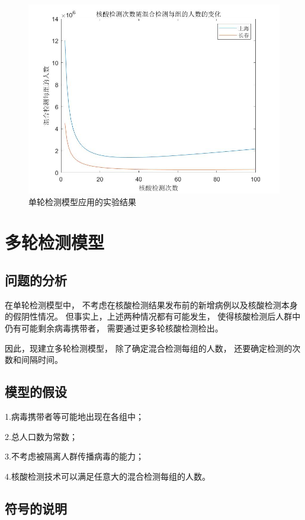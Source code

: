 \documentclass[12pt]{article}
\begin{document}
\begin{figure}[h]
\includegraphics[width=\textwidth]{simple.jpg}
\caption{单轮检测模型应用的实验结果}
\end{figure}

\newpage
{\centering\section{多轮检测模型}}

\subsection{问题的分析}

在单轮检测模型中，
不考虑在核酸检测结果发布前的新增病例以及核酸检测本身的假阴性情况。
但事实上，上述两种情况都有可能发生，
使得核酸检测后人群中仍有可能剩余病毒携带者，
需要通过更多轮核酸检测检出。

因此，现建立多轮检测模型，
除了确定混合检测每组的人数，
还要确定检测的次数和间隔时间。

\subsection{模型的假设}

1.病毒携带者等可能地出现在各组中；

2.总人口数为常数；

3.不考虑被隔离人群传播病毒的能力；

4.核酸检测技术可以满足任意大的混合检测每组的人数。

\subsection{符号的说明}
\end{document}
